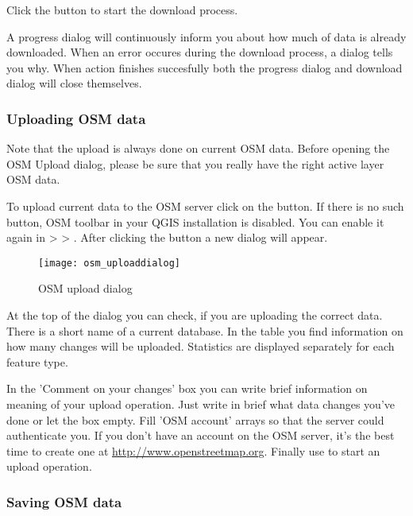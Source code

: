 Click the  button to start the download process.

A progress dialog will continuously inform you about how much of data is
already downloaded. When an error occures during the download process, a 
dialog tells you why. When action finishes succesfully both the progress dialog
and download dialog will close themselves.

\subsubsection{Uploading OSM data}  

Note that the upload is always done on current OSM data. Before opening the 
OSM Upload dialog, please be sure that you really have the right active 
layer ~ OSM data.

To upload current data to the OSM server click on the 
 button. If there is no such button, 
OSM toolbar in your QGIS installation is disabled. You can enable it 
again in  >  > 
. After clicking the  button a 
new dialog will appear.

\begin{figure}[ht]
   \begin{center}
   \caption{OSM upload dialog \nixcaption}\label{fig:osmupload}\smallskip
   \texttt{[image: osm\_uploaddialog]}
\end{center}
\end{figure}

At the top of the dialog you can check, if you are uploading the correct data. 
There is a short name of a current database. In the table you find information 
on how many changes will be uploaded. Statistics are displayed separately 
for each feature type.

In the 'Comment on your changes' box you can write brief information on 
meaning of your upload operation. Just write in brief what data changes 
you've done or let the box empty.
Fill 'OSM account' arrays so that the server could authenticate you. If 
you don't have an account on the OSM server, it's the best time to create 
one at \url{http://www.openstreetmap.org}. Finally use  to 
start an upload operation.

\subsubsection{Saving OSM data}  

